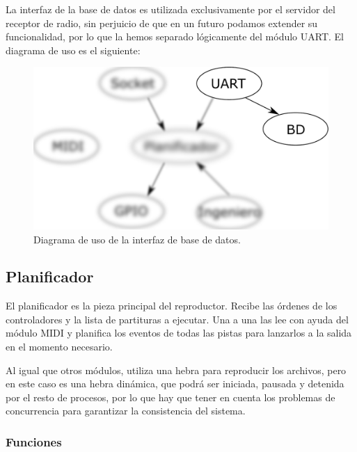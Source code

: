 La interfaz de la base de datos es utilizada exclusivamente por el servidor del receptor de radio, sin perjuicio de que en un futuro podamos extender su funcionalidad, por lo que la hemos separado lógicamente del módulo \acrshort{UART}. El diagrama de uso es el siguiente:

\smallskip

\begin{figure}[H]
	\noindent \begin{centering}
		\includegraphics[width=\linewidth/2]{capitulo4/daemon_bd}
		\par\end{centering}
	\smallskip
	\caption{\label{fig:daemon_bd} Diagrama de uso de la interfaz de base de datos.}
\end{figure} 

\smallskip

\subsection{Planificador}
\label{subsec:planificador}

El planificador es la pieza principal del reproductor. Recibe las órdenes de los controladores y la lista de partituras a ejecutar. Una a una las lee con ayuda del módulo \acrshort{MIDI} y planifica los eventos de todas las pistas para lanzarlos a la salida en el momento necesario.

Al igual que otros módulos, utiliza una hebra para reproducir los archivos, pero en este caso es una hebra dinámica, que podrá ser iniciada, pausada y detenida por el resto de procesos, por lo que hay que tener en cuenta los problemas de concurrencia para garantizar la consistencia del sistema.

\subsubsection{Funciones}

